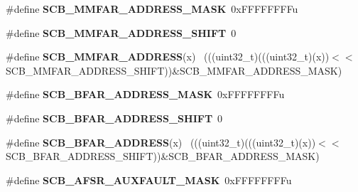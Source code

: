 \begin{DoxyCompactItemize}
\item 
\hypertarget{group___s_c_b___register___masks_gace4ff806f8aabb7e600007a84705b8fe}{}\#define {\bfseries S\+C\+B\+\_\+\+M\+M\+F\+A\+R\+\_\+\+A\+D\+D\+R\+E\+S\+S\+\_\+\+M\+A\+S\+K}~0x\+F\+F\+F\+F\+F\+F\+F\+Fu\label{group___s_c_b___register___masks_gace4ff806f8aabb7e600007a84705b8fe}

\item 
\hypertarget{group___s_c_b___register___masks_ga0073a1a7ca16b1512b6e3b2029737938}{}\#define {\bfseries S\+C\+B\+\_\+\+M\+M\+F\+A\+R\+\_\+\+A\+D\+D\+R\+E\+S\+S\+\_\+\+S\+H\+I\+F\+T}~0\label{group___s_c_b___register___masks_ga0073a1a7ca16b1512b6e3b2029737938}

\item 
\hypertarget{group___s_c_b___register___masks_gab51a95c10ac693d8fd9863c859d062a8}{}\#define {\bfseries S\+C\+B\+\_\+\+M\+M\+F\+A\+R\+\_\+\+A\+D\+D\+R\+E\+S\+S}(x)                                      ~(((uint32\+\_\+t)(((uint32\+\_\+t)(x))$<$$<$S\+C\+B\+\_\+\+M\+M\+F\+A\+R\+\_\+\+A\+D\+D\+R\+E\+S\+S\+\_\+\+S\+H\+I\+F\+T))\&S\+C\+B\+\_\+\+M\+M\+F\+A\+R\+\_\+\+A\+D\+D\+R\+E\+S\+S\+\_\+\+M\+A\+S\+K)\label{group___s_c_b___register___masks_gab51a95c10ac693d8fd9863c859d062a8}

\item 
\hypertarget{group___s_c_b___register___masks_ga06dcfef31b1e1581acbd10898ff4518b}{}\#define {\bfseries S\+C\+B\+\_\+\+B\+F\+A\+R\+\_\+\+A\+D\+D\+R\+E\+S\+S\+\_\+\+M\+A\+S\+K}~0x\+F\+F\+F\+F\+F\+F\+F\+Fu\label{group___s_c_b___register___masks_ga06dcfef31b1e1581acbd10898ff4518b}

\item 
\hypertarget{group___s_c_b___register___masks_ga31b33596b81d9fc88c64157b518bd434}{}\#define {\bfseries S\+C\+B\+\_\+\+B\+F\+A\+R\+\_\+\+A\+D\+D\+R\+E\+S\+S\+\_\+\+S\+H\+I\+F\+T}~0\label{group___s_c_b___register___masks_ga31b33596b81d9fc88c64157b518bd434}

\item 
\hypertarget{group___s_c_b___register___masks_ga1ebe7e735178cf8245b2bfc1af3cea0a}{}\#define {\bfseries S\+C\+B\+\_\+\+B\+F\+A\+R\+\_\+\+A\+D\+D\+R\+E\+S\+S}(x)                                        ~(((uint32\+\_\+t)(((uint32\+\_\+t)(x))$<$$<$S\+C\+B\+\_\+\+B\+F\+A\+R\+\_\+\+A\+D\+D\+R\+E\+S\+S\+\_\+\+S\+H\+I\+F\+T))\&S\+C\+B\+\_\+\+B\+F\+A\+R\+\_\+\+A\+D\+D\+R\+E\+S\+S\+\_\+\+M\+A\+S\+K)\label{group___s_c_b___register___masks_ga1ebe7e735178cf8245b2bfc1af3cea0a}

\item 
\hypertarget{group___s_c_b___register___masks_ga7664f289a25c34670bd752c23fd47c8a}{}\#define {\bfseries S\+C\+B\+\_\+\+A\+F\+S\+R\+\_\+\+A\+U\+X\+F\+A\+U\+L\+T\+\_\+\+M\+A\+S\+K}~0x\+F\+F\+F\+F\+F\+F\+F\+Fu\label{group___s_c_b___register___masks_ga7664f289a25c34670bd752c23fd47c8a}


\end{DoxyCompactItemize}
